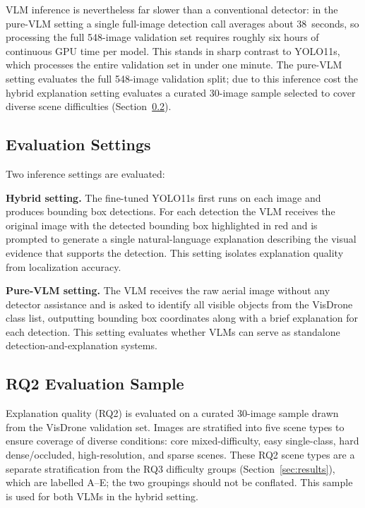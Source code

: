 \documentclass[acmtog, authorversion]{acmart}
\begin{document}
VLM inference is nevertheless far slower than a conventional
detector: in the pure-VLM setting a single full-image detection call
averages about 38~seconds, so processing the full 548-image
validation set requires roughly six hours of continuous GPU time per
model. This stands in sharp contrast to YOLO11s, which
processes the entire validation set in under one minute. The
pure-VLM setting evaluates the full 548-image validation split;
due to this inference cost the hybrid explanation setting evaluates
a curated 30-image sample selected to cover diverse scene
difficulties (Section~\ref{sec:rq2sample}).

\subsection{Evaluation Settings}

Two inference settings are evaluated:

\textbf{Hybrid setting.} The fine-tuned YOLO11s first runs on each
image and produces bounding box detections. For each detection the VLM
receives the original image with the detected bounding box highlighted
in red and is prompted to generate a single natural-language explanation
describing the visual evidence that supports the detection. This setting
isolates explanation quality from localization accuracy.

\textbf{Pure-VLM setting.} The VLM receives the raw aerial image
without any detector assistance and is asked to identify all visible
objects from the VisDrone class list, outputting bounding box
coordinates along with a brief explanation for each detection. This
setting evaluates whether VLMs can serve as standalone
detection-and-explanation systems.

\subsection{RQ2 Evaluation Sample}
\label{sec:rq2sample}

Explanation quality (RQ2) is evaluated on a curated 30-image sample
drawn from the VisDrone validation set. Images are stratified into
five scene types to ensure coverage of diverse conditions:
core mixed-difficulty, easy single-class, hard dense/occluded,
high-resolution, and sparse scenes. These RQ2 scene types are a
separate stratification from the RQ3 difficulty groups
(Section~\ref{sec:results}), which are labelled A--E; the two
groupings should not be conflated. This sample is used for both VLMs in
the hybrid setting.
\end{document}
